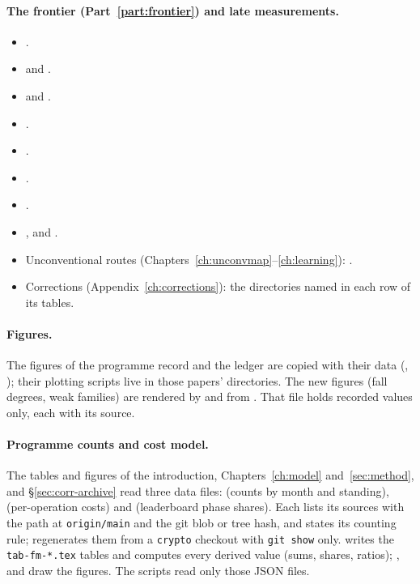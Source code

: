 \paragraph{The frontier (Part~\ref{part:frontier}) and late measurements.}
\begin{itemize}
\item {}.
\item {} and .
\item {} and
  .
\item {}.
\item {}.
\item {}.
\item {}.
\item {}, 
  and .
\item Unconventional routes (Chapters~\ref{ch:unconvmap}--\ref{ch:learning}):
  .
\item Corrections (Appendix~\ref{ch:corrections}): the directories named in
  each row of its tables.
\end{itemize}

\paragraph{Figures.} The figures of the programme record and the ledger are
copied with their data (,
); their plotting scripts live in those
papers' directories. The new figures (fall degrees, weak families) are
rendered by  and
 from . That file
holds recorded values only, each with its source.

\paragraph{Programme counts and cost model.} The tables and figures of the
introduction, Chapters~\ref{ch:model} and~\ref{sec:method}, and
\S\ref{sec:corr-archive} read three data files:
 (counts by month and standing),
 (per-operation costs) and
 (leaderboard phase shares). Each lists
its sources with the path at \texttt{origin/main} and the git blob or tree
hash, and states its counting rule; 
regenerates them from a \texttt{crypto} checkout with \texttt{git show}
only.  writes the
\texttt{tab-fm-*.tex} tables and computes every derived value (sums,
shares, ratios); ,
 and 
draw the figures. The scripts read only those JSON files.
